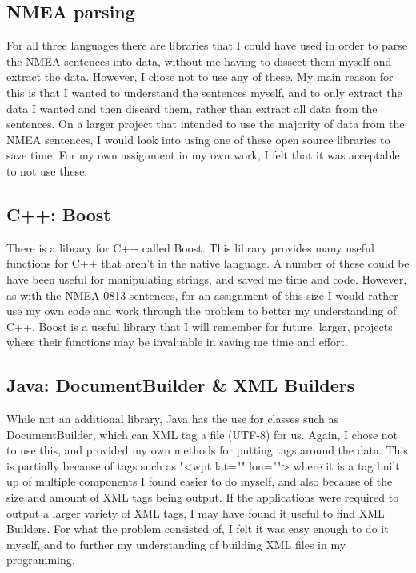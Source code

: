 \documentclass{article}
\begin{document}
\subsection{NMEA parsing}
For all three languages there are libraries that I could have used in order to parse the NMEA sentences into data, without me having to dissect them myself and extract the data\cite{nmeajava}\cite{nmeacplusplus}. However, I chose not to use any of these. My main reason for this is that I wanted to understand the sentences myself, and to only extract the data I wanted and then discard them, rather than extract all data from the sentences. On a larger project that intended to use the majority of data from the NMEA sentences, I would look into using one of these open source libraries to save time. For my own assignment in my own work, I felt that it was acceptable to not use these.

\subsection{C++: Boost}
There is a library for C++ called Boost\cite{boost}. This library provides many useful functions for C++ that aren't in the native language. A number of these could be have been useful for manipulating strings, and saved me time and code. However, as with the NMEA 0813 sentences, for an assignment of this size I would rather use my own code and work through the problem to better my understanding of C++. Boost is a useful library that I will remember for future, larger, projects where their functions may be invaluable in saving me time and effort.

\subsection{Java: DocumentBuilder \& XML Builders}
While not an additional library, Java has the use for classes such as DocumentBuilder, which can XML tag a file (UTF-8) for us. Again, I chose not to use this, and provided my own methods for putting tags around the data. This is partially because of tags such as "<wpt lat="" lon=""> where it is a tag built up of multiple components I found easier to do myself, and also because of the size and amount of XML tags being output. If the applications were required to output a larger variety of XML tags, I may have found it useful to find XML Builders. For what the problem consisted of, I felt it was easy enough to do it myself, and to further my understanding of building XML files in my programming.
\end{document}
